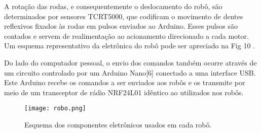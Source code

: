 A rota{\c c}{\~a}o das rodas, e consequentemente o deslocamento
do rob{\^o}, s{\~a}o determinados por sensores TCRT5000, que
codificam o movimento de dentes reflexivos fixados às rodas
em pulsos enviados ao Arduino. Esses pulsos s{\~a}o contados e
servem de realimenta{\c c}{\~a}o ao acionamento direcionado a cada
motor. Um esquema representativo da eletr{\^o}nica do rob{\^o} pode
ser apreciado na Fig 10 .

Do lado do computador pessoal, o envio dos comandos
tamb{\'e}m ocorre atrav{\'e}s de um circuito controlado por um
Arduino Nano[6] conectado a uma interface USB. Este Arduino
recebe os comandos a ser enviados aos rob{\^o}s e os transmite por
meio de um transceptor de r{\'a}dio NRF24L01 id{\^e}ntico ao
utilizados nos rob{\^o}s.

\begin{figure}[!htb]
\centering
\texttt{[image: robo.png]}
\caption{Esquema dos componentes eletr{\^o}nicos usados em cada rob{\^o}.}
\label{Rotulo}
\end{figure} 
